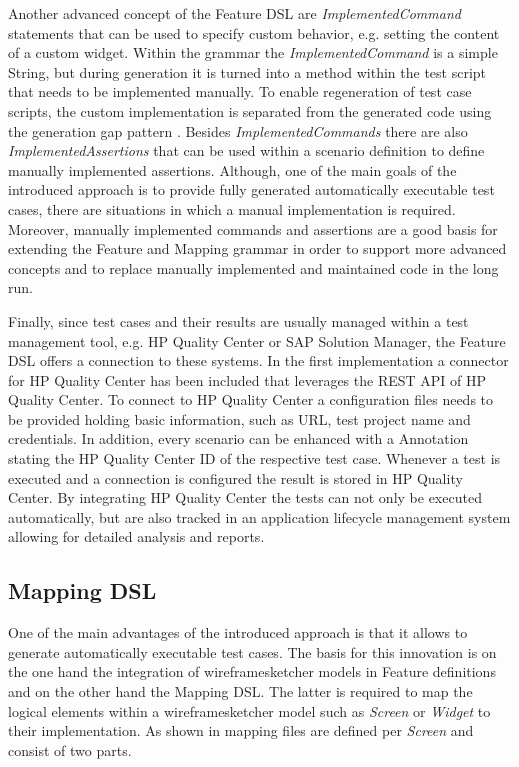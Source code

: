 \documentclass{sig-alternate-05-2015}
\begin{document}
Another advanced concept of the Feature DSL are \textit{ImplementedCommand} statements that can be used to specify custom behavior, e.g. setting the content of a custom widget.
Within the grammar the \textit{ImplementedCommand} is a simple String, but during generation it is turned into a method within the test script that needs to be implemented manually. 
To enable regeneration of test case scripts, the custom implementation is separated from the generated code using the generation gap pattern \cite{behrens.2009}.
Besides \textit{ImplementedCommands} there are also \textit{ImplementedAssertions} that can be used within a scenario definition to define manually implemented assertions.
Although, one of the main goals of the introduced approach is to provide fully generated automatically executable test cases, there are situations in which a manual implementation is required. 
Moreover, manually implemented commands and assertions are a good basis for extending the Feature and Mapping grammar in order to support more advanced concepts and to replace manually implemented and maintained code in the long run.

Finally, since test cases and their results are usually managed within a test management tool, e.g. HP Quality Center or SAP Solution Manager, the Feature DSL offers a connection to these systems.
In the first implementation a connector for HP Quality Center has been included that leverages the REST API of HP Quality Center.
To connect to HP Quality Center a configuration files needs to be provided holding basic information, such as URL, test project name and credentials.
In addition, every scenario can be enhanced with a Annotation stating the HP Quality Center ID of the respective test case.
Whenever a test is executed and a connection is configured the result is stored in HP Quality Center.
By integrating HP Quality Center the tests can not only be executed automatically, but are also tracked in an application lifecycle management system allowing for detailed analysis and reports.


\subsection{Mapping DSL}
One of the main advantages of the introduced approach is that it allows to generate automatically executable test cases.
The basis for this innovation is on the one hand the integration of wireframesketcher models in Feature definitions and on the other hand the Mapping DSL.
The latter is required to map the logical elements within a wireframesketcher model such as \textit{Screen} or \textit{Widget} to their implementation.
As shown in  mapping files are defined per \textit{Screen} and consist of two parts.
\end{document}

